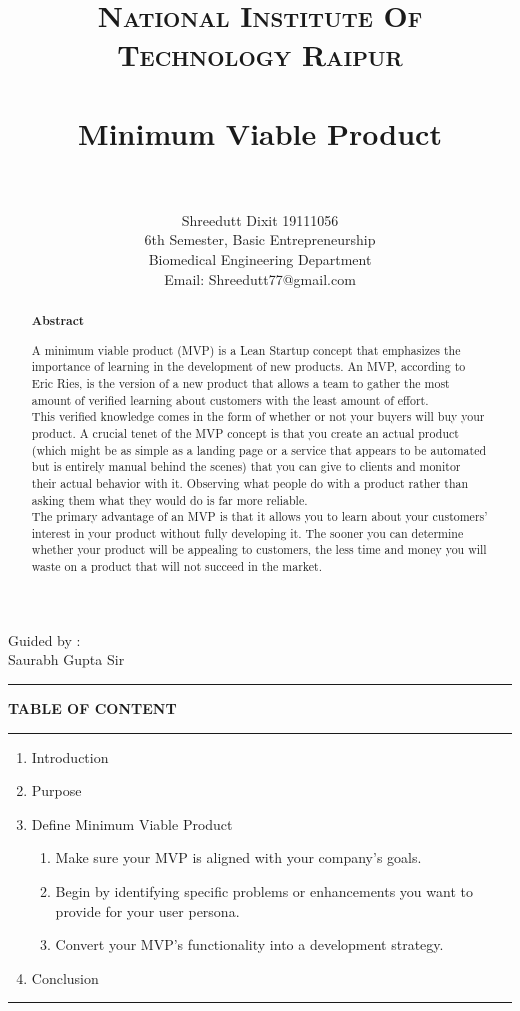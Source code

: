 \documentclass[paper=a4, fontsize=11pt]{scrartcl}
\title{
		\usefont{OT1}{bch}{b}{n}
		\normalfont \normalsize \textsc{National Institute Of Technology Raipur} \\ [25pt]
		\horrule{0.5pt} \\[0.4cm]
		\huge Minimum Viable Product  \\
		\horrule{2pt} \\[0.5cm]
}
\author{
        Shreedutt Dixit 19111056\\6th Semester, 
        Basic Entrepreneurship\\ Biomedical Engineering Department\\	
        Email: Shreedutt77@gmail.com
        \normalsize
}
\date{}
\numberwithin{equation}{section}		%
\numberwithin{figure}{section}			%
\numberwithin{table}{section}				%
\begin{document}
\maketitle
\begin{flushright}
    Guided by :\\
    Saurabh Gupta Sir
\end{flushright}

\noindent\rule{\textwidth}{1pt}
\begin{abstract}

    \begin{center}
        \Large{\textbf{Abstract}}\\
        
    \end{center}

    \Large { A minimum viable product (MVP) is a Lean Startup concept that emphasizes the importance of learning in the development of new products. An MVP, according to Eric Ries, is the version of a new product that allows a team to gather the most amount of verified learning about customers with the least amount of effort.\\
    This verified knowledge comes in the form of whether or not your buyers will buy your product.
    A crucial tenet of the MVP concept is that you create an actual product (which might be as simple as a landing page or a service that appears to be automated but is entirely manual behind the scenes) that you can give to clients and monitor their actual behavior with it. 
    \newpage Observing what people do with a product rather than asking them what they would do is far more reliable.\\
    The primary advantage of an MVP is that it allows you to learn about your customers' interest in your product without fully developing it. The sooner you can determine whether your product will be appealing to customers, the less time and money you will waste on a product that will not succeed in the market. }
\end{abstract}

\newpage
\textbf{TABLE OF CONTENT}\\
\rule{\textwidth}{1pt}
\begin{enumerate}
    \item Introduction
    \item Purpose
    \item Define Minimum Viable Product
    \begin{enumerate}
        \item Make sure your MVP is aligned with your company's goals.
        \item Begin by identifying specific problems or enhancements you want to provide for your user persona.
        \item Convert your MVP's functionality into a development strategy.
    \end{enumerate}
    \item Conclusion
\end{enumerate}
\rule{\textwidth}{1pt}
\newpage
\Large
\end{document}
